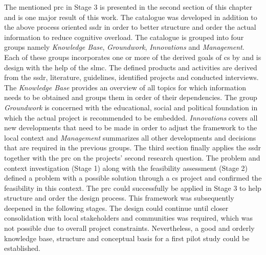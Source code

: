 The mentioned \acrshort{prc} in Stage 3 is presented in the second section of this chapter and is one major result of this work. The catalogue was developed in addition to the above process oriented \acrshort{ssdr} in order to better structure and order the actual information to reduce cognitive overload. The catalogue is grouped into four groups namely \textit{Knowledge Base}, \textit{Groundwork}, \textit{Innovations} and \textit{Management}. Each of these groups incorporates one or more of the derived goals of \acrlong{cs} by \autocite{minkmanCitizenScienceWater2015} and is design with the help of the \acrlong{slmc}. The defined products and activities are derived from the \acrshort{ssdr}, literature, guidelines, identified projects and conducted interviews. The \textit{Knowledge Base} provides an overview of all topics for which information needs to be obtained and groups them in order of their dependencies. The group \textit{Groundwork} is concerned with the educational, social and political foundation in which the actual project is recommended to be embedded. \textit{Innovations} covers all new developments that need to be made in order to adjust the framework to the local context and \textit{Management} summarizes all other developments and decisions that are required in the previous groups.\newline
The third section finally applies the \acrshort{ssdr} together with the \acrshort{prc} on the projects' second research question. The problem and context investigation (Stage 1) along with the feasibility assessment (Stage 2) defined a problem with a possible solution through a \acrshort{cs} project and confirmed the feasibility in this context. The \acrshort{prc} could successfully be applied in Stage 3 to help structure and order the design process. This framework was subsequently deepened in the following stages. The design could continue until closer consolidation with local stakeholders and communities was required, which was not possible due to overall project constraints. Nevertheless, a good and orderly knowledge base, structure and conceptual basis for a first pilot study could be established.
